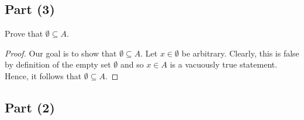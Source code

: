 \documentclass[a4paper]{article}
\begin{document}
\subsection*{Part (3)} Prove that \( \emptyset \subseteq  A  \).

\begin{proof}
        Our goal is to show that \( \emptyset \subseteq  A  \). Let \( x \in \emptyset \) be arbitrary. Clearly, this is false by definition of the empty set \( \emptyset  \) and so \( x \in A  \) is a vacuously true statement. Hence, it follows that \( \emptyset \subseteq  A  \).
    \end{proof}

\subsection*{Part (2)}
\end{document}
